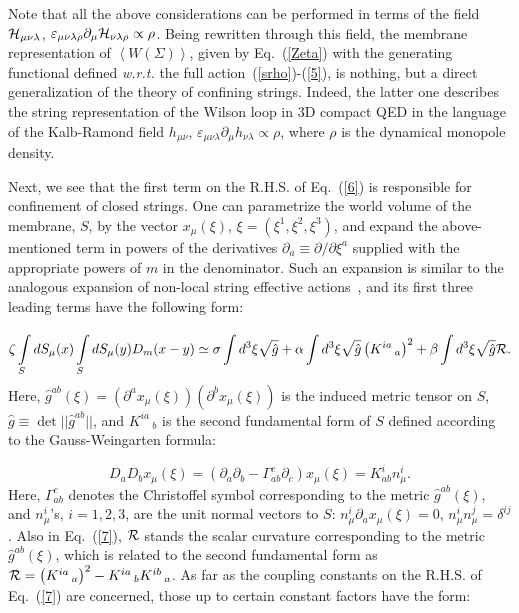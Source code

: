 \documentclass[a4paper,12pt]{article}
\begin{document}
Note that all the above considerations can be 
performed in terms of the field ${\cal H}_{\mu\nu\lambda}$, $\varepsilon_{\mu\nu\lambda\rho}\partial_\mu
{\cal H}_{\nu\lambda\rho}\propto\rho$. Being rewritten through this field, the 
membrane representation of $\left<W(\Sigma)\right>$, given by Eq.~(\ref{Zeta}) with the generating functional
defined {\it w.r.t.} the full action~(\ref{srho})-(\ref{5}), 
is nothing, but a direct generalization of the 
theory of confining strings. Indeed, the latter one describes the string representation of the Wilson 
loop in 3D compact QED in the language of the Kalb-Ramond field $h_{\mu\nu}$, $\varepsilon_{\mu\nu\lambda}
\partial_\mu h_{\nu\lambda}\propto\rho$, where $\rho$ is the dynamical monopole density.

Next, we see that the first term on the R.H.S. of Eq.~(\ref{6}) is responsible for confinement of closed strings. 
One can parametrize the world volume of the membrane, $S$, by the vector $x_\mu(\xi)$, 
$\xi=\left(\xi^1,\xi^2,\xi^3\right)$, and expand the above-mentioned term in powers of the derivatives 
$\partial_a\equiv\partial/\partial\xi^a$ supplied with the appropriate powers of $m$ in the denominator. 
Such an expansion is similar to the analogous expansion of non-local string effective actions~\cite{exp, 2},
and its first three leading terms have the following form:

\begin{equation}
\label{7}
\zeta\int\limits_{S}^{}dS_\mu(x)\int\limits_{S}^{}dS_\mu(y)D_m(x-y)\simeq\sigma\int d^3\xi\sqrt{\hat g}+
\alpha\int d^3\xi\sqrt{\hat g}\left(K^{ia}{\,}_a\right)^2+
\beta\int d^3\xi\sqrt{\hat g}{\cal R}.
\end{equation}
Here, $\hat g^{ab}(\xi)=(\partial^ax_\mu(\xi))(\partial^bx_\mu(\xi))$ is the induced metric tensor on $S$,
$\hat g\equiv \det||\hat g^{ab}||$, and $K^{ia}{\,}_b$ is the second fundamental form of $S$ defined 
according to the Gauss-Weingarten formula:

$$D_aD_bx_\mu(\xi)=\left(\partial_a\partial_b-\Gamma_{ab}^c\partial_c\right)x_\mu(\xi)=K^i_{ab}n_\mu^i.$$
Here, $\Gamma_{ab}^c$ denotes the Christoffel symbol corresponding to the metric $\hat g^{ab}(\xi)$, and $n_\mu^i$'s, 
$i=1,2,3$, are the unit normal vectors to $S$: $n_\mu^i\partial_ax_\mu(\xi)=0$, $n_\mu^in_\mu^j=\delta^{ij}$.
Also in Eq.~(\ref{7}), 
${\cal R}$ stands the scalar curvature corresponding to the metric $\hat g^{ab}(\xi)$, which is related 
to the second fundamental form as ${\cal R}=\left(K^{ia}{\,}_a\right)^2-K^{ia}{\,}_bK^{ib}{\,}_a$.
As far as the coupling constants on the R.H.S. of Eq.~(\ref{7}) are concerned, those up to certain  
constant factors have the form:
\end{document}
